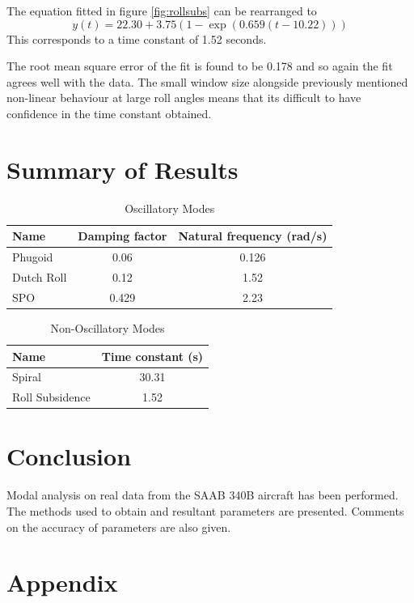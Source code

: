 \documentclass{article}
\begin{document}
The equation fitted in figure \ref{fig:rollsubs} can be rearranged to
\begin{equation}
  y(t) = 22.30 + 3.75(1 - \exp(0.659 (t - 10.22)))
\end{equation}
This corresponds to a time constant of 1.52 seconds.

The root mean square error of the fit is found to be 0.178 and so again the fit agrees well with the data.
The small window size alongside previously mentioned non-linear behaviour at large roll angles means that its difficult to have confidence in the time constant obtained.

\section{Summary of Results}

\begin{table}[H]
  \centering
  \begin{tabular}{lcc}
      \toprule
      Name & Damping factor & Natural frequency (rad/s) \\
      \midrule
      Phugoid & 0.06 & 0.126 \\
      Dutch Roll & 0.12 & 1.52 \\
      SPO & 0.429 & 2.23 \\
      \bottomrule
  \end{tabular}
  \caption{Oscillatory Modes}
\end{table}

\begin{table}[H]
  \centering
  \begin{tabular}{lc}
      \toprule
      Name & Time constant (s) \\
      \midrule
      Spiral & 30.31 \\
      Roll Subsidence & 1.52 \\
      \bottomrule
  \end{tabular}
  \caption{Non-Oscillatory Modes}
\end{table}

\section{Conclusion}

Modal analysis on real data from the SAAB 340B aircraft has been performed.
The methods used to obtain and resultant parameters are presented.
Comments on the accuracy of parameters are also given.

\section{Appendix}
\end{document}
